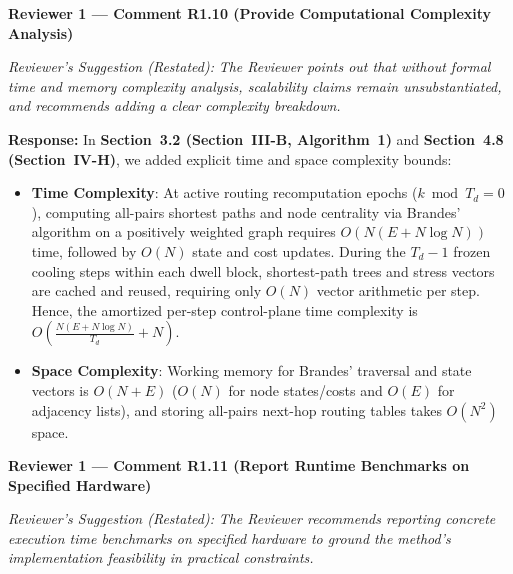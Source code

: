 \documentclass[11pt,a4paper]{article}
\newcommand{\cbox}[2]{%
  \vspace{0.6em}\noindent\textbf{#1}\par\smallskip
  \noindent\textit{Reviewer's Suggestion (Restated):} \textit{#2}\par\smallskip
}
\begin{document}
\hrulefill

\cbox{Reviewer 1 --- Comment R1.10 (Provide Computational Complexity Analysis)}{The Reviewer points out that without formal time and memory complexity analysis, scalability claims remain unsubstantiated, and recommends adding a clear complexity breakdown.}

\noindent\textbf{Response:} In \textbf{Section~3.2 (Section~III-B, Algorithm~1)} and \textbf{Section~4.8 (Section~IV-H)}, we added explicit time and space complexity bounds:
\begin{itemize}[leftmargin=1.8em]
    \item \textbf{Time Complexity}: At active routing recomputation epochs ($k \bmod T_d = 0$), computing all-pairs shortest paths and node centrality via Brandes' algorithm on a positively weighted graph requires $O(N(E + N\log N))$ time, followed by $O(N)$ state and cost updates. During the $T_d - 1$ frozen cooling steps within each dwell block, shortest-path trees and stress vectors are cached and reused, requiring only $O(N)$ vector arithmetic per step. Hence, the amortized per-step control-plane time complexity is $O\!\left(\frac{N(E + N\log N)}{T_d} + N\right)$.
    \item \textbf{Space Complexity}: Working memory for Brandes' traversal and state vectors is $O(N + E)$ ($O(N)$ for node states/costs and $O(E)$ for adjacency lists), and storing all-pairs next-hop routing tables takes $O(N^2)$ space.
\end{itemize}

\hrulefill

\cbox{Reviewer 1 --- Comment R1.11 (Report Runtime Benchmarks on Specified Hardware)}{The Reviewer recommends reporting concrete execution time benchmarks on specified hardware to ground the method's implementation feasibility in practical constraints.}
\end{document}
